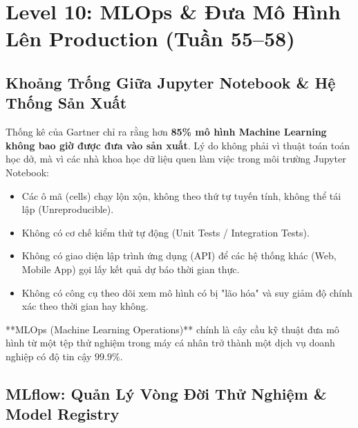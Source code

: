 \chapter{Level 10: MLOps \& Đưa Mô Hình Lên Production (Tuần 55--58)}

\section{Khoảng Trống Giữa Jupyter Notebook \& Hệ Thống Sản Xuất}

Thống kê của Gartner chỉ ra rằng hơn \textbf{85\% mô hình Machine Learning không bao giờ được đưa vào sản xuất}. Lý do không phải vì thuật toán toán học dở, mà vì các nhà khoa học dữ liệu quen làm việc trong môi trường Jupyter Notebook:
\begin{itemize}
    \item Các ô mã (cells) chạy lộn xộn, không theo thứ tự tuyến tính, không thể tái lập (Unreproducible).
    \item Không có cơ chế kiểm thử tự động (Unit Tests / Integration Tests).
    \item Không có giao diện lập trình ứng dụng (API) để các hệ thống khác (Web, Mobile App) gọi lấy kết quả dự báo thời gian thực.
    \item Không có công cụ theo dõi xem mô hình có bị "lão hóa" và suy giảm độ chính xác theo thời gian hay không.
\end{itemize}
**MLOps (Machine Learning Operations)** chính là cây cầu kỹ thuật đưa mô hình từ một tệp thử nghiệm trong máy cá nhân trở thành một dịch vụ doanh nghiệp có độ tin cậy $99.9\%$.

\section{MLflow: Quản Lý Vòng Đời Thử Nghiệm \& Model Registry}

